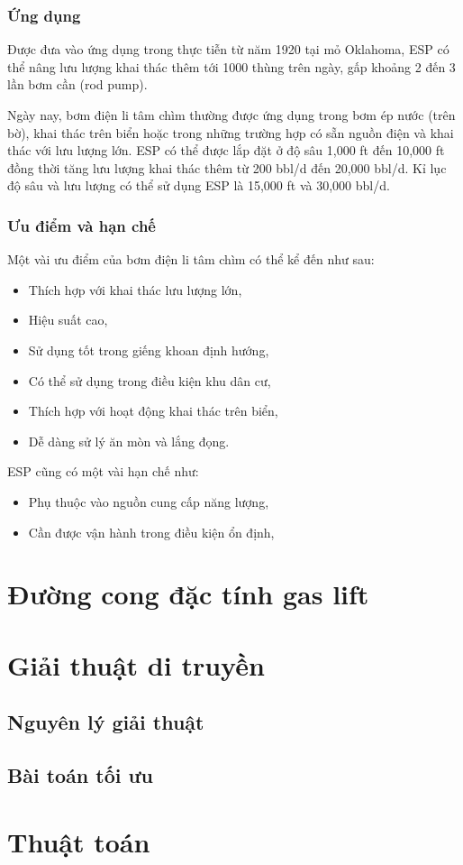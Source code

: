 \documentclass[12pt,a4paper]{report}
\begin{document}
\subsubsection{Ứng dụng}
Được đưa vào ứng dụng trong thực tiễn từ năm 1920 tại mỏ Oklahoma, ESP có thể nâng lưu lượng khai thác thêm tới 1000 thùng trên ngày, gấp khoảng 2 đến 3 lần bơm cần (rod pump).

Ngày nay, bơm điện li tâm chìm thường được ứng dụng trong bơm ép nước (trên bờ), khai thác trên biển hoặc trong những trường hợp có sẵn nguồn điện và khai thác với lưu lượng lớn. ESP có thể được lắp đặt ở độ sâu 1,000 ft đến 10,000 ft đồng thời tăng lưu lượng khai thác thêm từ 200 bbl/d đến 20,000 bbl/d. Kỉ lục độ sâu và lưu lượng có thể sử dụng ESP là 15,000 ft và 30,000 bbl/d.

\subsubsection{Ưu điểm và hạn chế}

Một vài ưu điểm của bơm điện li tâm chìm có thể kể đến như sau:
	\begin{itemize}
		\item Thích hợp với khai thác lưu lượng lớn,
		\item Hiệu suất cao,
		\item Sử dụng tốt trong giếng khoan định hướng,
		\item Có thể sử dụng trong điều kiện khu dân cư,
		\item Thích hợp với hoạt động khai thác trên biển,
		\item Dễ dàng sử lý ăn mòn và lắng đọng.
	\end{itemize}
ESP cũng có một vài hạn chế như:
	\begin{itemize}
		\item Phụ thuộc vào nguồn cung cấp năng lượng,
		\item Cần được vận hành trong điều kiện ổn định,
	\end{itemize}

\section{Đường cong đặc tính gas lift}

\section{Giải thuật di truyền}
\subsection{Nguyên lý giải thuật}

\subsection{Bài toán tối ưu}

\section{Thuật toán}
\end{document}
